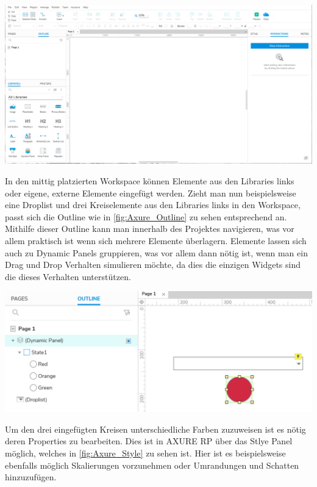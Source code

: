 \begin{center}
  \includegraphics[scale=0.3]{figures/Axure_Full.png}
  \label{fig:Axure_Full}
\end{center}

In den mittig platzierten Workspace können Elemente aus den Libraries links oder eigene, externe Elemente eingefügt werden.
Zieht man nun beispielsweise eine Droplist und drei Kreiselemente aus den Libraries links in den Workspace, passt sich die Outline wie in \cref{fig:Axure_Outline} zu sehen entsprechend an.
Mithilfe dieser Outline kann man innerhalb des Projektes navigieren, was vor allem praktisch ist wenn sich mehrere Elemente überlagern.
Elemente lassen sich auch zu Dynamic Panels gruppieren, was vor allem dann nötig ist, wenn man ein Drag und Drop Verhalten simulieren möchte, da dies die einzigen Widgets sind die dieses Verhalten unterstützen.

\begin{center}
  \includegraphics[scale=0.4]{figures/AXURE_Outline.PNG}
  \label{fig:Axure_Outline}
\end{center}

Um den drei eingefügten Kreisen unterschiedliche Farben zuzuweisen ist es nötig deren Properties zu bearbeiten.
Dies ist in AXURE RP über das Stlye Panel möglich, welches in \cref{fig:Axure_Style} zu sehen ist.
Hier ist es beispielsweise ebenfalls möglich Skalierungen vorzunehmen oder Umrandungen und Schatten hinzuzufügen.


